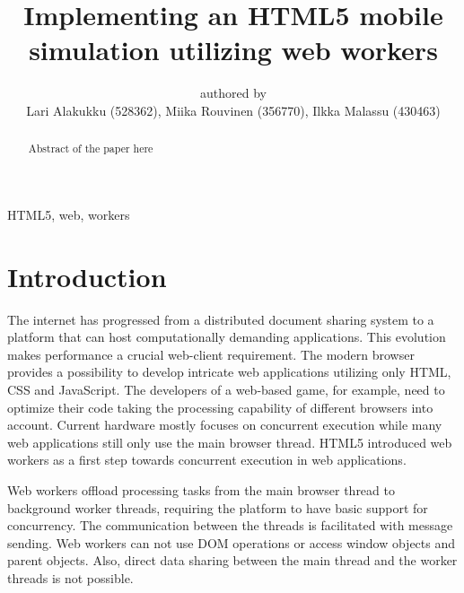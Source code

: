 \documentclass[conference]{IEEEtran}
\begin{document}
\title{Implementing an HTML5 mobile simulation utilizing web workers}

\author{authored by\\
        Lari Alakukku (528362),
        Miika Rouvinen (356770),
        Ilkka Malassu (430463)}%

\makeatletter         
\def\@maketitle{
\begin{center}
{\Huge \bfseries \sffamily \@title }\\[4ex] 
Submitted on \@date\\
{\normalsize \@author}\\[4ex] 
\end{center}}
\makeatother


\maketitle

\begin{IEEEkeywords}
HTML5, web, workers
\end{IEEEkeywords}

\begin{abstract}

Abstract of the paper here
 
\end{abstract}

\section{Introduction}
\label{chap:introduction}

The internet has progressed from a distributed document sharing system to a platform that can host computationally demanding applications. This evolution makes performance a crucial web-client requirement. The modern browser provides a possibility to develop intricate web applications utilizing only HTML, CSS and JavaScript. The developers of a web-based game, for example, need to optimize their code taking the processing capability of different browsers into account. Current hardware mostly focuses on concurrent execution while many web applications still only use the main browser thread. HTML5 introduced web workers as a first step towards concurrent execution in web applications. \cite{doha}

Web workers offload processing tasks from the main browser thread to background worker threads, requiring the platform to have basic support for concurrency. The communication between the threads is facilitated with message sending. Web workers can not use DOM operations or access window objects and parent objects. Also, direct data sharing between the main thread and the worker threads is not possible. \cite{doha, watanabe}
\end{document}
